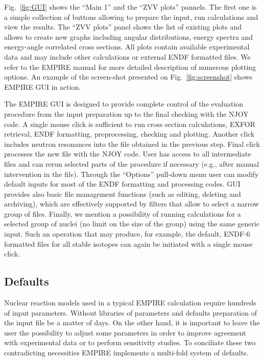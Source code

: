 \documentclass[twocolumn,amsmath,amssymb,10pt,groupedaddress,letter]{revtex4}
\begin{document}
Fig.~\ref{fig:GUI} shows the ``Main 1'' and the ``ZVV plots'' pannels. The first one is a simple collection of buttons allowing to prepare the input, run calculations and view the results. The ``ZVV plots'' panel shows the list of existing plots and allows to create new graphs including angular distributions, energy spectra and energy-angle correlated cross sections. All plots contain available experimental data and may include other calculations or external ENDF formatted files.  We refer to the EMPIRE manual for more detailed description of numerous plotting options. An example of the screen-shot presented on Fig.~\ref{fig:screenshot} shows EMPIRE GUI in action.

\begin{figure*}[htbp]
\caption{\label{fig:screenshot} Screen-shot of the EMPIRE GUI with a generated plot of cross sections for the inelastic scattering to the first 4 levels in $^{89}$Y. Note the capability of the interface to multiply results by a power of 10 to separate the curves.}
\end{figure*}


The EMPIRE GUI is designed to provide complete control of the evaluation procedure from the input preparation up to the final checking with the NJOY code. A single mouse click is sufficient to run cross section calculations, EXFOR retrieval, ENDF formatting, preprocessing, checking and plotting. Another click includes neutron resonances into the file obtained in the previous step. Final click processes the new file with the NJOY code. User has access to all intermediate files and can rerun selected parts of the procedure if necessary (e.g., after manual intervention in the file). Through the ``Options'' pull-down menu user can modify default inputs for most of the ENDF formatting and processing codes. GUI provides also basic file management  functions (such as editing, deleting and archiving), which are effectively supported by filters that allow to select a narrow group of files. Finally, we mention a possibility of running calculations for a selected group of nuclei (no limit on the size of the group) using the same generic input. Such an operation that may produce, for example, the default, ENDF-6 formatted files for all stable isotopes can again be initiated with a single mouse click.


\subsection{Defaults}
Nuclear reaction models used in a typical EMPIRE calculation require hundreds of input parameters. Without libraries of parameters and defaults preparation of the input file be a matter of days. On the other hand, it is important to leave the user the possibility to adjust some parameters in order to improve agreement with experimental data or to perform sensitivity studies. To conciliate these two contradicting necessities EMPIRE implements a multi-fold system of defaults.
\end{document}

